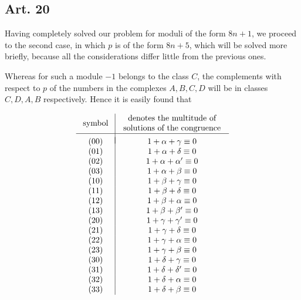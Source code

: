 \documentclass{book}
\theoremstyle{plain}
\theoremstyle{remark}
\begin{document}
\subsection*{Art. 20} 

Having completely solved our problem for moduli of the form $8n+1$, we proceed to the second case, in which $p$ is of the form $8n+5$, which will be solved more briefly, because all the considerations differ little from the previous ones.  

Whereas for such a module $-1$ belongs to the class $C$, the complements with respect to $p$ of the numbers in the complexes $A, B, C, D$ will be in classes $C, D, A, B$ respectively.  Hence it is easily found that

\[ \begin{array}{c|c}
\textrm{ symbol } & \begin{array}{c}\textrm{denotes the multitude of} \\ \textrm{solutions of the congruence} \end{array} \\
\hline \\[-8pt]
(00) & \hspace{0mm} 1 + \alpha + \gamma \equiv 0  \\
(01) & \hspace{0mm} 1 + \alpha + \delta \equiv 0  \\
(02) & \hspace{0mm} 1 + \alpha + \alpha' \equiv 0  \\
(03) & \hspace{0mm} 1 + \alpha + \beta \equiv 0  \\
(10) & \hspace{0mm} 1 + \beta + \gamma \equiv 0  \\
(11) & \hspace{0mm} 1 + \beta + \delta \equiv 0  \\
(12) & \hspace{0mm} 1 + \beta + \alpha \equiv 0  \\
(13) & \hspace{0mm} 1 + \beta + \beta' \equiv 0  \\
(20) & \hspace{0mm} 1 + \gamma + \gamma' \equiv 0  \\
(21) & \hspace{0mm} 1 + \gamma + \delta \equiv 0  \\
(22) & \hspace{0mm} 1 + \gamma + \alpha \equiv 0  \\
(23) & \hspace{0mm} 1 + \gamma + \beta \equiv 0  \\
(30) & \hspace{0mm} 1 + \delta + \gamma \equiv 0  \\
(31) & \hspace{0mm} 1 + \delta + \delta' \equiv 0  \\
(32) & \hspace{0mm} 1 + \delta + \alpha \equiv 0  \\
(33) & \hspace{0mm} 1 + \delta + \beta \equiv 0  
\end{array} 
\]
\end{document}
